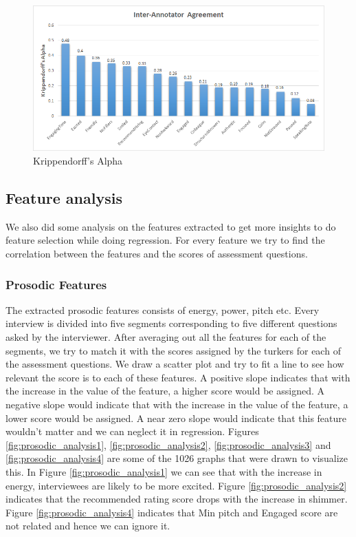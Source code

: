 \documentclass[11pt]{article}
\begin{document}
\begin{figure}[h!]
\begin{center}
\includegraphics[width=1\columnwidth]{figures/k-alpha scores.png}
\caption{Krippendorff's Alpha}
\label{fig:interrater}
\end{center}
\end{figure}

\subsection{Feature analysis}
We also did some analysis on the features extracted to get more insights to do feature selection while doing regression. For every feature we try to find the correlation between the features and the scores of assessment questions.
\subsubsection{Prosodic Features}
The extracted prosodic features consists of energy, power, pitch etc. Every interview is divided into five segments corresponding to five different questions asked by the interviewer. After averaging out all the features for each of the segments, we try to match it with the scores assigned by the turkers for each of the assessment questions. We draw a scatter plot and try to fit a line to see how relevant the score is to each of these features. A positive slope indicates that with the increase in the value of the feature, a higher score would be assigned. A negative slope would indicate that with the increase in the value of the feature, a lower score would be assigned. A near zero slope would indicate that this feature wouldn't matter and we can neglect it in regression. Figures \ref{fig:prosodic_analysis1}, \ref{fig:prosodic_analysis2}, \ref{fig:prosodic_analysis3} and \ref{fig:prosodic_analysis4} are some of the 1026 graphs that were drawn to visualize this. In Figure \ref{fig:prosodic_analysis1} we can see that with the increase in energy, interviewees are likely to be more excited. Figure \ref{fig:prosodic_analysis2} indicates that the recommended rating score drops with the increase in shimmer. Figure \ref{fig:prosodic_analysis4} indicates that Min pitch and Engaged score are not related and hence we can ignore it. 
\end{document}
